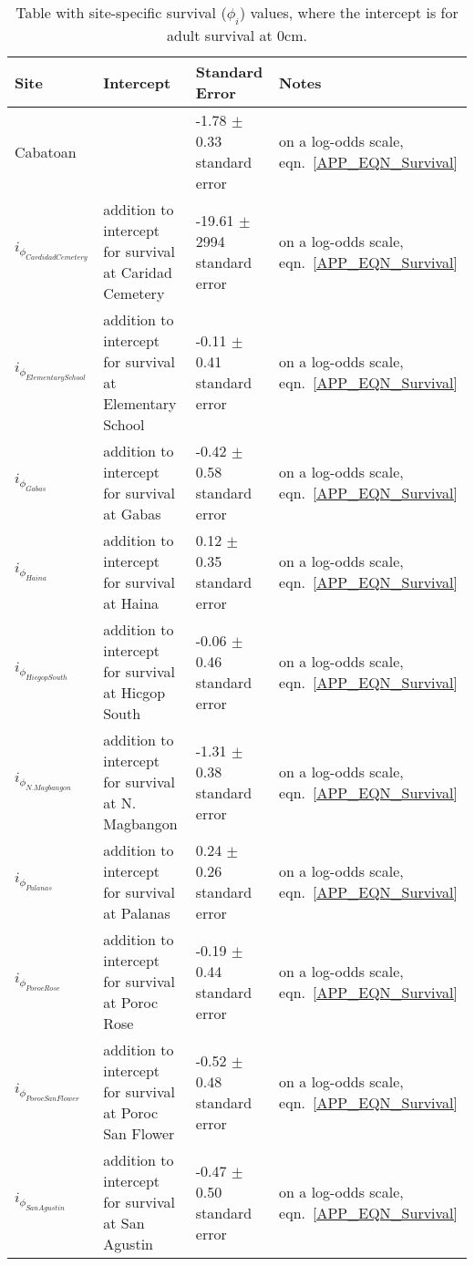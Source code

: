 \documentclass[12pt, oneside]{article}   	%
\begin{document}
\begin{table}[!htbp]
\begin{centering}
\caption{Table with site-specific survival ($\phi_i$) values, where the intercept is for adult survival at 0cm.} \label{APP_TAB_SiteSurvivals}
\begin{tabular}{|p{1.1in}|p{1.5in}|p{1.5in}|p{1.8in}|}
\hline 
\textbf{Site} & \textbf{Intercept} & \textbf{Standard Error} & \textbf{Notes} \\ \hline
Cabatoan & & -1.78 $\pm$ 0.33 standard error & on a log-odds scale, eqn.\ \ref{APP_EQN_Survival} \\ \hline 
$i_{\phi_{Cardidad Cemetery}}$ & addition to intercept for survival at Caridad Cemetery & -19.61 $\pm$ 2994 standard error & on a log-odds scale, eqn.\ \ref{APP_EQN_Survival} \\ \hline
$i_{\phi_{Elementary School}}$ & addition to intercept for survival at Elementary School & -0.11 $\pm$ 0.41 standard error & on a log-odds scale, eqn.\ \ref{APP_EQN_Survival} \\ \hline
$i_{\phi_{Gabas}}$ & addition to intercept for survival at Gabas & -0.42 $\pm$ 0.58 standard error & on a log-odds scale, eqn.\ \ref{APP_EQN_Survival} \\ \hline
$i_{\phi_{Haina}}$ & addition to intercept for survival at Haina & 0.12 $\pm$ 0.35 standard error & on a log-odds scale, eqn.\ \ref{APP_EQN_Survival} \\ \hline
$i_{\phi_{Hicgop South}}$ & addition to intercept for survival at Hicgop South & -0.06 $\pm$ 0.46 standard error & on a log-odds scale, eqn.\ \ref{APP_EQN_Survival} \\ \hline
$i_{\phi_{N. Magbangon}}$ & addition to intercept for survival at N. Magbangon & -1.31 $\pm$ 0.38 standard error & on a log-odds scale, eqn.\ \ref{APP_EQN_Survival} \\ \hline
$i_{\phi_{Palanas}}$ & addition to intercept for survival at Palanas & 0.24 $\pm$ 0.26 standard error & on a log-odds scale, eqn.\ \ref{APP_EQN_Survival} \\ \hline
$i_{\phi_{Poroc Rose}}$ & addition to intercept for survival at Poroc Rose & -0.19 $\pm$ 0.44 standard error & on a log-odds scale, eqn.\ \ref{APP_EQN_Survival} \\ \hline
$i_{\phi_{Poroc San Flower}}$ & addition to intercept for survival at Poroc San Flower & -0.52 $\pm$ 0.48 standard error & on a log-odds scale, eqn.\ \ref{APP_EQN_Survival} \\ \hline
$i_{\phi_{San Agustin}}$ & addition to intercept for survival at San Agustin & -0.47 $\pm$ 0.50 standard error & on a log-odds scale, eqn.\ \ref{APP_EQN_Survival} \\ \hline

\end{tabular}
\end{centering}
\end{table}
\end{document}
